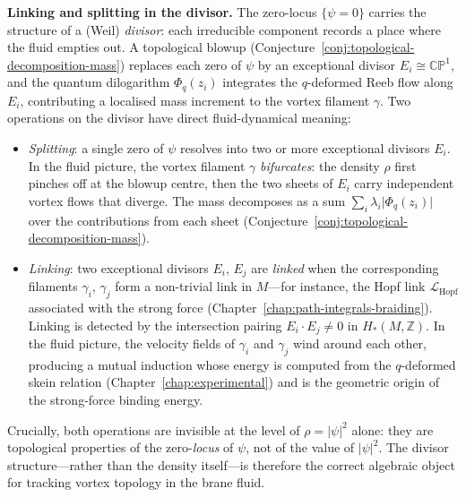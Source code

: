 \begin{remark}
\medskip
\noindent\textbf{Linking and splitting in the divisor.}\;
The zero-locus $\{\psi = 0\}$ carries the structure of a (Weil)
\emph{divisor}: each irreducible component records a place where the
fluid empties out.  A topological blowup
(Conjecture~\ref{conj:topological-decomposition-mass}) replaces each
zero of $\psi$ by an exceptional divisor
$E_i \cong \mathbb{CP}^1$, and the quantum dilogarithm $\Phi_q(z_i)$
integrates the $q$-deformed Reeb flow along $E_i$, contributing a
localised mass increment to the vortex filament $\gamma$.  Two
operations on the divisor have direct fluid-dynamical meaning:
\begin{itemize}
  \item \emph{Splitting}: a single zero of $\psi$ resolves into two or
        more exceptional divisors $E_i$.  In the fluid picture, the
        vortex filament $\gamma$ \emph{bifurcates}: the density $\rho$
        first pinches off at the blowup centre, then the two sheets of
        $E_i$ carry independent vortex flows that diverge.  The mass
        decomposes as a sum $\sum_i \lambda_i\lvert\Phi_q(z_i)\rvert$
        over the contributions from each sheet
        (Conjecture~\ref{conj:topological-decomposition-mass}).
  \item \emph{Linking}: two exceptional divisors $E_i$, $E_j$ are
        \emph{linked} when the corresponding filaments $\gamma_i$,
        $\gamma_j$ form a non-trivial link in $M$---for instance, the
        Hopf link $\mathcal{L}_{\mathrm{Hopf}}$ associated with the
        strong force
        (Chapter~\ref{chap:path-integrals-braiding}).  Linking is
        detected by the intersection pairing $E_i \cdot E_j \neq 0$ in
        $H_*(M, \mathbb{Z})$.  In the fluid picture, the velocity fields
        of $\gamma_i$ and $\gamma_j$ wind around each other, producing a
        mutual induction whose energy is computed from the $q$-deformed
        skein relation (Chapter~\ref{chap:experimental}) and is the
        geometric origin of the strong-force binding energy.
\end{itemize}
Crucially, both operations are invisible at the level of $\rho =
\lvert\psi\rvert^2$ alone: they are topological properties of the
zero-\emph{locus} of $\psi$, not of the value of $\lvert\psi\rvert^2$.
The divisor structure---rather than the density itself---is therefore
the correct algebraic object for tracking vortex topology in the brane
fluid.
\end{remark}


